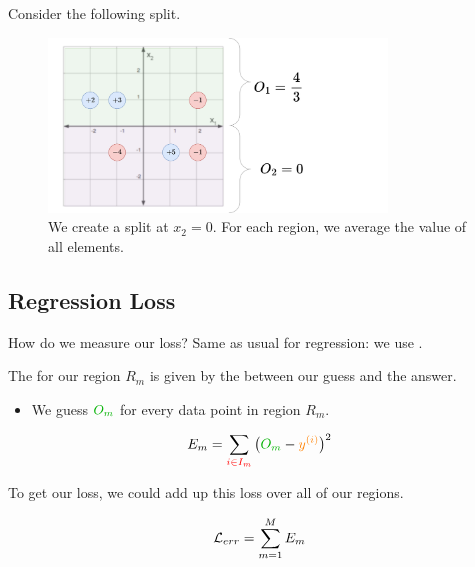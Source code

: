         \miniex Consider the following split.

        \begin{figure}[H]
            \centering
            \includegraphics[width=90mm,scale=0.5]{images/nonparametric_images/x2_split_averaged.png}
            \caption*{We create a split at $x_2=0$. For each region, we average the value of all elements.}
        \end{figure}




    \phantom{}

    \subsection{Regression Loss}

        How do we measure our loss? Same as usual for regression: we use .\\

        \begin{definition}
            The  for our region $R_m$ is given by the  between our guess and the answer.
            
            \begin{itemize}
                \item We guess $\grn{O_m}$ for every data point in region $R_m$.
            \end{itemize}

            \begin{equation*}
                E_m = \sum_{\red{i \in I_m}} \big( \grn{O_m} - \org{\ex{y}{i}} \big)^2
            \end{equation*}
        \end{definition}

        To get our loss, we could add up this loss over all of our regions.

        \begin{equation}
            \mathcal{L}_{err} = \sum_{m=1}^M E_m
        \end{equation}

